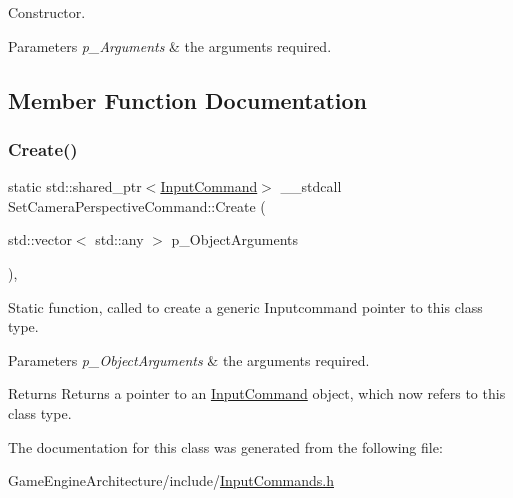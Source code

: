 Constructor. 


\begin{DoxyParams}{Parameters}
{\em p\+\_\+\+Arguments} & the arguments required. \\
\hline
\end{DoxyParams}


\subsection{Member Function Documentation}
\mbox{\label{class_set_camera_perspective_command_afa8c4690696eec2fd17af44eb7894086}} 
\subsubsection{\texorpdfstring{Create()}{Create()}}
{\footnotesize\ttfamily static std\+::shared\+\_\+ptr$<$\mbox{\hyperlink{class_input_command}{Input\+Command}}$>$ \+\_\+\+\_\+stdcall Set\+Camera\+Perspective\+Command\+::\+Create (\begin{DoxyParamCaption}\item[{std\+::vector$<$ std\+::any $>$}]{p\+\_\+\+Object\+Arguments }\end{DoxyParamCaption})\hspace{0.3cm}{\ttfamily [inline]}, {\ttfamily [static]}}



Static function, called to create a generic Inputcommand pointer to this class type. 


\begin{DoxyParams}{Parameters}
{\em p\+\_\+\+Object\+Arguments} & the arguments required. \\
\hline
\end{DoxyParams}
\begin{DoxyReturn}{Returns}
Returns a pointer to an \mbox{\hyperlink{class_input_command}{Input\+Command}} object, which now refers to this class type. 
\end{DoxyReturn}


The documentation for this class was generated from the following file\+:\begin{DoxyCompactItemize}
\item 
Game\+Engine\+Architecture/include/\mbox{\hyperlink{_input_commands_8h}{Input\+Commands.\+h}}\end{DoxyCompactItemize}

